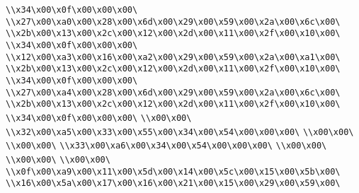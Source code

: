 \verb|\\x34\x00\x0f\x00\x00\x00\|\newline
\verb|\\x27\x00\xa0\x00\x28\x00\x6d\x00\x29\x00\x59\x00\x2a\x00\x6c\x00\|\newline
\verb|\\x2b\x00\x13\x00\x2c\x00\x12\x00\x2d\x00\x11\x00\x2f\x00\x10\x00\|\newline
\verb|\\x34\x00\x0f\x00\x00\x00\|\newline
\verb|\\x12\x00\xa3\x00\x16\x00\xa2\x00\x29\x00\x59\x00\x2a\x00\xa1\x00\|\newline
\verb|\\x2b\x00\x13\x00\x2c\x00\x12\x00\x2d\x00\x11\x00\x2f\x00\x10\x00\|\newline
\verb|\\x34\x00\x0f\x00\x00\x00\|\newline
\verb|\\x27\x00\xa4\x00\x28\x00\x6d\x00\x29\x00\x59\x00\x2a\x00\x6c\x00\|\newline
\verb|\\x2b\x00\x13\x00\x2c\x00\x12\x00\x2d\x00\x11\x00\x2f\x00\x10\x00\|\newline
\verb|\\x34\x00\x0f\x00\x00\x00\|\newline
\verb|\\x00\x00\|\newline
\verb|\\x32\x00\xa5\x00\x33\x00\x55\x00\x34\x00\x54\x00\x00\x00\|\newline
\verb|\\x00\x00\|\newline
\verb|\\x00\x00\|\newline
\verb|\\x33\x00\xa6\x00\x34\x00\x54\x00\x00\x00\|\newline
\verb|\\x00\x00\|\newline
\verb|\\x00\x00\|\newline
\verb|\\x00\x00\|\newline
\verb|\\x0f\x00\xa9\x00\x11\x00\x5d\x00\x14\x00\x5c\x00\x15\x00\x5b\x00\|\newline
\verb|\\x16\x00\x5a\x00\x17\x00\x16\x00\x21\x00\x15\x00\x29\x00\x59\x00\|\newline
